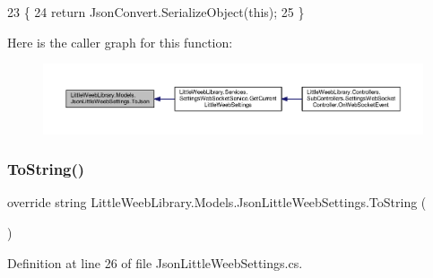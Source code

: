 \begin{DoxyCode}
23         \{
24             \textcolor{keywordflow}{return} JsonConvert.SerializeObject(\textcolor{keyword}{this});
25         \}
\end{DoxyCode}
Here is the caller graph for this function\+:\nopagebreak
\begin{figure}[H]
\begin{center}
\leavevmode
\includegraphics[width=350pt]{class_little_weeb_library_1_1_models_1_1_json_little_weeb_settings_afb2de66338da820dca2c6c6703008a82_icgraph}
\end{center}
\end{figure}
\mbox{\label{class_little_weeb_library_1_1_models_1_1_json_little_weeb_settings_a9aca9f5ee262951043ae1fd7d58d3127}} 
\subsubsection{\texorpdfstring{To\+String()}{ToString()}}
{\footnotesize\ttfamily override string Little\+Weeb\+Library.\+Models.\+Json\+Little\+Weeb\+Settings.\+To\+String (\begin{DoxyParamCaption}{ }\end{DoxyParamCaption})}



Definition at line 26 of file Json\+Little\+Weeb\+Settings.\+cs.


